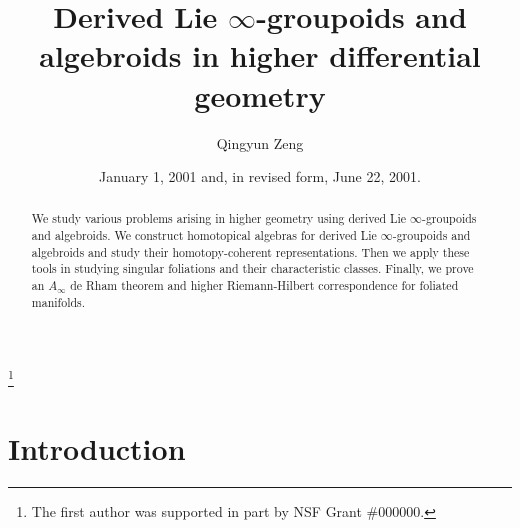 \documentclass[12pt]{amsart}
\theoremstyle{definition}
\theoremstyle{remark}
\numberwithin{equation}{section}
\newcommand{\1}{{\mathbb{1}}}
\begin{document}
\title{Derived Lie $\infty$-groupoids and algebroids in higher differential geometry}

\author{Qingyun Zeng}
\address{Department of Mathematics,
	University of Pennsylvania, Philadelphia, PA 19104}
\thanks{The first author was supported in part by NSF Grant \#000000.}



\date{January 1, 2001 and, in revised form, June 22, 2001.}



\begin{abstract}
We study various problems arising in higher geometry using derived Lie $\infty$-groupoids and algebroids. We construct homotopical algebras for derived Lie $\infty$-groupoids and algebroids and study their homotopy-coherent representations. Then we apply these tools in studying singular foliations and their characteristic classes. Finally, we prove an $A_{\infty}$ de Rham theorem and higher Riemann-Hilbert correspondence for foliated manifolds.
\end{abstract}

\maketitle
\tableofcontents	
\part{Introduction}
\end{document}
